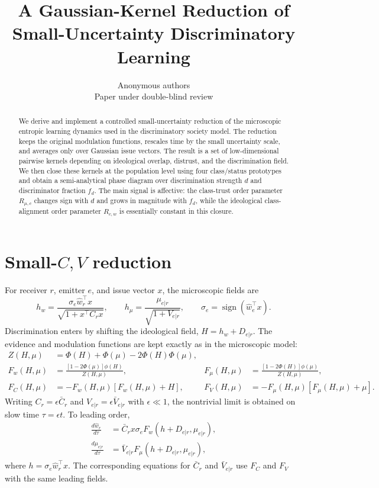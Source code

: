\documentclass{article}
\title{A Gaussian-Kernel Reduction of Small-Uncertainty Discriminatory Learning}
\author{Anonymous authors\\Paper under double-blind review}
\newcommand{\PhiN}{\Phi}
\newcommand{\phin}{\phi}
\newcommand{\Fw}{F_w}
\newcommand{\Fmu}{F_\mu}
\newcommand{\FC}{F_C}
\newcommand{\FV}{F_V}
\newcommand{\Rmuc}{R_{\mu,c}}
\newcommand{\Rcw}{R_{c,w}}
\begin{document}
\maketitle

\begin{abstract}
We derive and implement a controlled small-uncertainty reduction of the
microscopic entropic learning dynamics used in the discriminatory society model.
The reduction keeps the original modulation functions, rescales time by the
small uncertainty scale, and averages only over Gaussian issue vectors.  The
result is a set of low-dimensional pairwise kernels depending on ideological
overlap, distrust, and the discrimination field.  We then close these kernels at
the population level using four class/status prototypes and obtain a
semi-analytical phase diagram over discrimination strength \(d\) and
discriminator fraction \(f_d\).  The main signal is affective: the class-trust
order parameter \(\Rmuc\) changes sign with \(d\) and grows in magnitude with
\(f_d\), while the ideological class-alignment order parameter \(\Rcw\) is
essentially constant in this closure.
\end{abstract}

\section{Small-\(C,V\) reduction}

For receiver \(r\), emitter \(e\), and issue vector \(x\), the microscopic
fields are
\begin{equation}
  h_w =
  \frac{\sigma_e \hat w_r^\top x}{\sqrt{1+x^\top C_r x}},
  \qquad
  h_\mu =
  \frac{\mu_{e|r}}{\sqrt{1+V_{e|r}}},
  \qquad
  \sigma_e = \operatorname{sign}(\hat w_e^\top x).
\end{equation}
Discrimination enters by shifting the ideological field,
\(H=h_w+D_{e|r}\).  The evidence and modulation functions are kept exactly as in
the microscopic model:
\begin{align}
  Z(H,\mu) &=
  \PhiN(H)+\PhiN(\mu)-2\PhiN(H)\PhiN(\mu),\\
  \Fw(H,\mu) &=
  \frac{[1-2\PhiN(\mu)]\phin(H)}{Z(H,\mu)},
  &
  \Fmu(H,\mu) &=
  \frac{[1-2\PhiN(H)]\phin(\mu)}{Z(H,\mu)},\\
  \FC(H,\mu) &= -\Fw(H,\mu)[\Fw(H,\mu)+H],
  &
  \FV(H,\mu) &= -\Fmu(H,\mu)[\Fmu(H,\mu)+\mu].
\end{align}
Writing \(C_r=\epsilon \bar C_r\) and \(V_{e|r}=\epsilon \bar V_{e|r}\) with
\(\epsilon\ll1\), the nontrivial limit is obtained on slow time
\(\tau=\epsilon t\).  To leading order,
\begin{align}
  \frac{d\hat w_r}{d\tau}
  &=
  \bar C_r x\sigma_e \Fw(h+D_{e|r},\mu_{e|r}),\\
  \frac{d\mu_{e|r}}{d\tau}
  &=
  \bar V_{e|r}\Fmu(h+D_{e|r},\mu_{e|r}),
\end{align}
where \(h=\sigma_e\hat w_r^\top x\).  The corresponding equations for
\(\bar C_r\) and \(\bar V_{e|r}\) use \(\FC\) and \(\FV\) with the same leading
fields.
\end{document}
